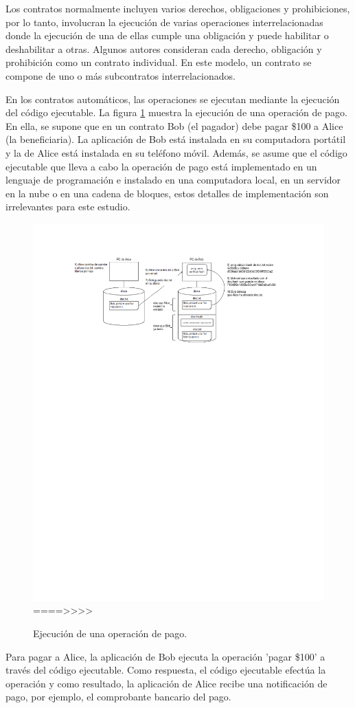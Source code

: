\documentclass[12pt]{report} %
\begin{document}
Los contratos normalmente incluyen varios derechos, obligaciones y prohibiciones, por lo tanto, involucran la ejecución de varias operaciones interrelacionadas donde la ejecución de una de ellas cumple una obligación y puede habilitar o deshabilitar a otras. Algunos autores consideran cada derecho, obligación y prohibición como un contrato individual. En este modelo, un contrato se compone de uno o más subcontratos interrelacionados.


En los contratos automáticos, las operaciones se ejecutan mediante la ejecución del código ejecutable. La figura \ref{fig:ejecucióncontrator} muestra la ejecución de una operación de pago. En ella, se supone que en un contrato Bob (el pagador) debe pagar \$100 a Alice (la beneficiaria). La aplicación de Bob está instalada en su computadora portátil y la de Alice está instalada en su teléfono móvil. Además, se asume que el código ejecutable que lleva a cabo la operación de pago está implementado en un lenguaje de programación e instalado en una computadora local, en un servidor en la nube o en una cadena de bloques, estos detalles de implementación son irrelevantes para este estudio.

\begin{figure}
\centering
\includegraphics[width=0.65\columnwidth]{imagenes/gatorojo.pdf}
   ====>>>> %
\caption{Ejecución de una operación de pago.}
\label{fig:ejecucióncontrator}
\end{figure}

Para pagar a Alice, la aplicación de Bob ejecuta la operación 'pagar \$100' a través del código ejecutable. Como respuesta, el código ejecutable efectúa la operación y como resultado, la aplicación de Alice recibe una notificación de pago, por ejemplo, el comprobante bancario del pago.
\end{document}
